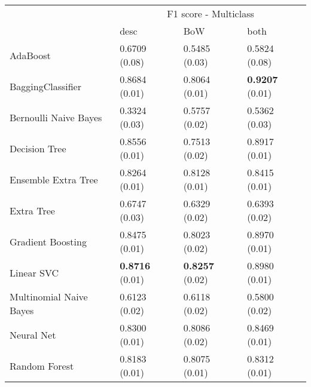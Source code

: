 \begin{tabular}{|l|l|l|l| }
\hline
 &  \multicolumn{3}{c|}{ F1 score - Multiclass} \\
\cline{2-4} & desc & BoW & both \\ \hline
AdaBoost                & 0.6709 (0.08) & 0.5485 (0.03) & 0.5824 (0.08)\\
BaggingClassifier       & 0.8684 (0.01) & 0.8064 (0.01) & {\bf 0.9207} (0.01)\\
Bernoulli Naive Bayes   & 0.3324 (0.03) & 0.5757 (0.02) & 0.5362 (0.03)\\
Decision Tree           & 0.8556 (0.01) & 0.7513 (0.02) & 0.8917 (0.01)\\
Ensemble Extra Tree     & 0.8264 (0.01) & 0.8128 (0.01) & 0.8415 (0.01)\\
Extra Tree              & 0.6747 (0.03) & 0.6329 (0.02) & 0.6393 (0.02)\\
Gradient Boosting       & 0.8475 (0.01) & 0.8023 (0.02) & 0.8970 (0.01)\\
Linear SVC              & {\bf 0.8716} (0.01) & {\bf 0.8257} (0.02) & 0.8980 (0.01)\\
Multinomial Naive Bayes & 0.6123 (0.02) & 0.6118 (0.02) & 0.5800 (0.02)\\
Neural Net              & 0.8300 (0.01) & 0.8086 (0.02) & 0.8469 (0.01)\\
Random Forest           & 0.8183 (0.01) & 0.8075 (0.01) & 0.8312 (0.01)\\
\hline
\end{tabular}